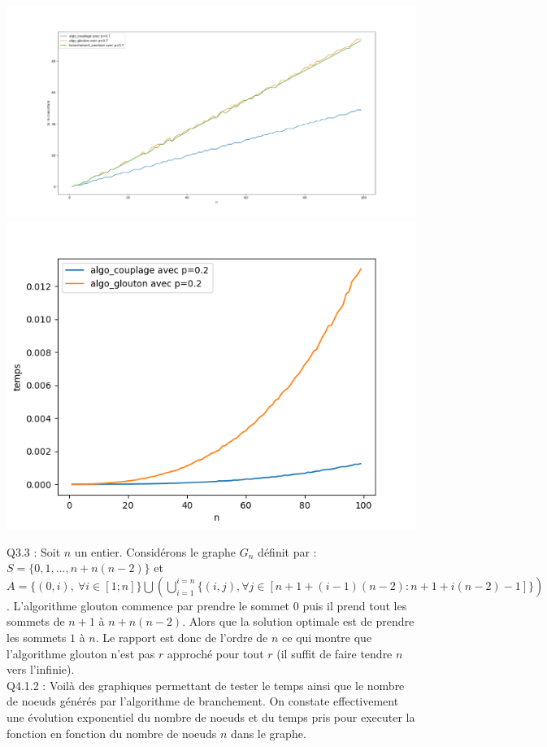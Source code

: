 \documentclass[a4paper]{article}
\begin{document}
\includegraphics[scale=0.3]{"./comparaison_approximation_p07.png"}
\includegraphics[scale=0.8]{"./comparaison_temps_approxs_p02.png"}

Q3.3 :
Soit $n$ un entier. Considérons le graphe $G_n$ définit par : $S=\{0,1,...,n + n(n-2)\}$ et $A=\{(0,i), \ \forall i \in [1;n]\} \bigcup ( \bigcup_{i=1}^{i=n} \{(i,j), \forall j \in [n+1+(i-1)(n-2):n+1+i(n-2)-1]\} )$. L'algorithme glouton commence par prendre le sommet $0$ puis il prend tout les sommets de $n+1$ à $n+n(n-2)$. Alors que la solution optimale est de prendre les sommets $1$ à $n$. Le rapport est donc de l'ordre de $n$ ce qui montre que l'algorithme glouton n'est pas $r$ approché pour tout $r$ (il suffit de faire tendre $n$ vers l'infinie). \\

Q4.1.2 :
Voilà des graphiques permettant de tester le temps ainsi que le nombre de noeuds générés par l'algorithme de branchement. On constate effectivement une évolution exponentiel du nombre de noeuds et du temps pris pour executer la fonction en fonction du nombre de noeuds $n$ dans le graphe.
\end{document}
